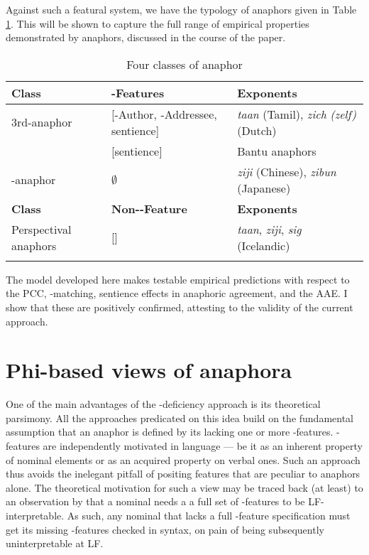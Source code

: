 \documentclass[output=paper, modfonts, nonflat]{langsci/langscibook}
\begin{document}
  Against such a featural system, we have the typology of anaphors
  given in Table \ref{anaph3}. This will be shown to capture the full
  range of empirical properties demonstrated by anaphors, discussed in
  the course of the paper.
  \begin{table}[!h]
  	\caption{Four classes of anaphor}
  	\label{anaph3}
  	\begin{tabularx}{\textwidth}{llX}  
  		\lsptoprule
  		\textbf{Class} &  \textbf{\person-Features} & \textbf{Exponents}\\  
  		\midrule
  		\textsc{3}rd-anaphor &  {[-Author, -Addressee, sentience]} & \textit{taan} (Tamil),
  		\textit{zich} \textit{(zelf)} (Dutch)\\
  		{}  & [sentience] & Bantu anaphors\\
  		\nul-anaphor &  $\emptyset$ & \textit{ziji} (Chinese),
  		\textit{zibun} (Japanese)\\
  		\midrule
  		\textbf{Class} & \textbf{Non-\ph-Feature} & \textbf{Exponents}\\
  		\midrule
  		Perspectival anaphors & [\dep] & \textit{taan},
  		\textit{ziji}, 
  		\textit{sig} (Icelandic)\\  		
  		\lspbottomrule
  	\end{tabularx}
  \end{table}
The model developed here makes testable empirical predictions with
  respect to the PCC, \ph-matching, sentience effects in anaphoric
  agreement, and the AAE. I show that these are positively confirmed,
  attesting to the validity of the current approach.

\newpage

\section{Phi-based views of anaphora}
\label{secphi}

One of the main advantages of the \ph-deficiency approach is its
  theoretical parsimony. All the approaches predicated on this idea
  build on the fundamental assumption that an anaphor is defined by
  its lacking one or more \ph-features. \ph-features are independently
  motivated in language --- be it as an inherent property of nominal
  elements or as an acquired property on verbal ones. Such an approach
  thus avoids the inelegant pitfall of positing features that are
  peculiar to anaphors alone. The theoretical motivation for such a
  view may be traced back (at least) to an observation by
  \citet{bouchard:1984} that a nominal needs a a full set of
  \ph-features to be LF-interpretable. As such, any nominal that lacks
  a full \ph-feature specification must get its missing \ph-features
  checked in syntax, on pain of being subsequently uninterpretable at
  LF.
\end{document}
